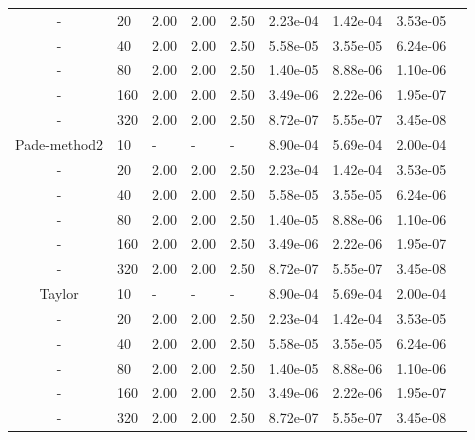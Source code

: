\begin{table}[p]
{\begin{tabular}{cllllllll}
   - &   20 & 2.00 & 2.00 & 2.50 & 2.23e-04 & 1.42e-04 & 3.53e-05 \\ 
   - &   40 & 2.00 & 2.00 & 2.50 & 5.58e-05 & 3.55e-05 & 6.24e-06 \\ 
   - &   80 & 2.00 & 2.00 & 2.50 & 1.40e-05 & 8.88e-06 & 1.10e-06 \\ 
   - &  160 & 2.00 & 2.00 & 2.50 & 3.49e-06 & 2.22e-06 & 1.95e-07 \\ 
   - &  320 & 2.00 & 2.00 & 2.50 & 8.72e-07 & 5.55e-07 & 3.45e-08 \\ 
   \hline
   Pade-method2 &   10 & - & - & - & 8.90e-04 & 5.69e-04 & 2.00e-04 \\ 
   - &   20 & 2.00 & 2.00 & 2.50 & 2.23e-04 & 1.42e-04 & 3.53e-05 \\ 
   - &   40 & 2.00 & 2.00 & 2.50 & 5.58e-05 & 3.55e-05 & 6.24e-06 \\ 
   - &   80 & 2.00 & 2.00 & 2.50 & 1.40e-05 & 8.88e-06 & 1.10e-06 \\ 
   - &  160 & 2.00 & 2.00 & 2.50 & 3.49e-06 & 2.22e-06 & 1.95e-07 \\ 
   - &  320 & 2.00 & 2.00 & 2.50 & 8.72e-07 & 5.55e-07 & 3.45e-08 \\ 
   \hline
   Taylor &   10 & - & - & - & 8.90e-04 & 5.69e-04 & 2.00e-04 \\ 
   - &   20 & 2.00 & 2.00 & 2.50 & 2.23e-04 & 1.42e-04 & 3.53e-05 \\ 
   - &   40 & 2.00 & 2.00 & 2.50 & 5.58e-05 & 3.55e-05 & 6.24e-06 \\ 
   - &   80 & 2.00 & 2.00 & 2.50 & 1.40e-05 & 8.88e-06 & 1.10e-06 \\ 
   - &  160 & 2.00 & 2.00 & 2.50 & 3.49e-06 & 2.22e-06 & 1.95e-07 \\ 
   - &  320 & 2.00 & 2.00 & 2.50 & 8.72e-07 & 5.55e-07 & 3.45e-08 \\ 
   \hline
   \end{tabular}
   }
\end{table}

\clearpage

